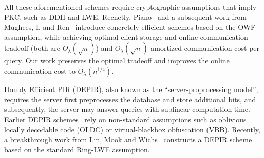 All these aforementioned schemes require cryptographic assumptions that imply PKC, such as DDH and LWE.
Recnetly, Piano~\cite{piano} and a subsequent work from Mughees, I, and Ren~\cite{lingrenpir} introduce concretely efficient schemes based on the OWF assumption, while achieving optimal client-storage and online communication tradeoff (both are $\widetilde{O}_\lambda(\sqrt{n})$) and $\widetilde{O}_\lambda(\sqrt{n})$ amortized communication cost per query.
Our work preserves the optimal tradeoff and improves the online communication cost to $\widetilde{O}_\lambda(n^{1/4})$.


Doubly Efficient PIR (DEPIR), also known as the ``server-proprocessing model'', requires the server
first preprocesses the database and store additional bits, and subsequently, the server may answer queries with sublinear computation time. 
Earlier DEPIR schemes~\cite{depir00,depir01} rely on non-standard assumptions such as oblivious locally decodable code (OLDC) or virtual-blackbox obfuscation (VBB). 
Recently, a breakthrough work from Lin, Mook and Wichs~\cite{weikai-depir} constructs a DEPIR scheme based on the standard Ring-LWE assumption. 
